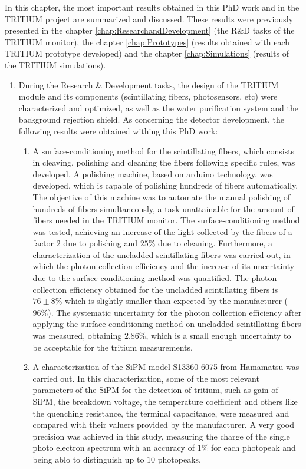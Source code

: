 In this chapter, the most important results obtained in this PhD work and in the TRITIUM project are summarized and discussed. These results were previously presented in the chapter \ref{chap:ResearchandDevelopment} (the R\&D tasks of the TRITIUM monitor), the chapter \ref{chap:Prototypes} (results obtained with each TRITIUM prototype developed) and the chapter \ref{chap:Simulations} (results of the TRITIUM simulations).


\begin{enumerate}
\item{} During the Research \& Development tasks, the design of the TRITIUM module and its components (scintillating fibers, photosensors, etc) were characterized and optimized, as well as the water purification system and the background rejection shield. As concerning the detector development, the following results were obtained withing this PhD work:

\begin{enumerate}
\item{} A surface-conditioning method for the scintillating fibers, which consists in cleaving, polishing and cleaning the fibers following specific rules, was developed. A polishing machine, based on arduino technology, was developed, which is capable of polishing hundreds of fibers automatically. The objective of this machine was to automate the manual polishing of hundreds of fibers simultaneously, a task unattainable for the amount of fibers needed in the TRITIUM monitor. The surface-conditioning method was tested, achieving an increase of the light collected by the fibers of a factor 2 due to polishing and $25\%$ due to cleaning. Furthermore, a characterization of the uncladded scintillating fibers was carried out, in which the photon collection efficiency and the increase of its uncertainty due to the surface-conditioning method was quantified. The photon collection efficiency obtained for the uncladded scintillating fibers is $76\pm 8\%$ which is slightly smaller than expected by the manufacturer ($96\%$). The systematic uncertainty for the photon collection efficiency after applying the surface-conditioning method on uncladded scintillating fibers was measured, obtaining $2.86\%$, which is a small enough uncertainty to be acceptable for the tritium measurements.

\item{} A characterization of the SiPM model S13360-6075 from Hamamatsu was carried out. In this characterization, some of the most relevant parameters of the SiPM for the detection of tritium, such as gain of SiPM, the breakdown voltage, the temperature coefficient and others like the quenching resistance, the terminal capacitance, were measured and compared with their valuers provided by the manufacturer. A very good precision was achieved in this study, measuring the charge of the single photo electron spectrum with an accuracy of $1\%$ for each photopeak and being ablo to distinguish up to $10$ photopeaks. %


\end{enumerate}
\end{enumerate}
